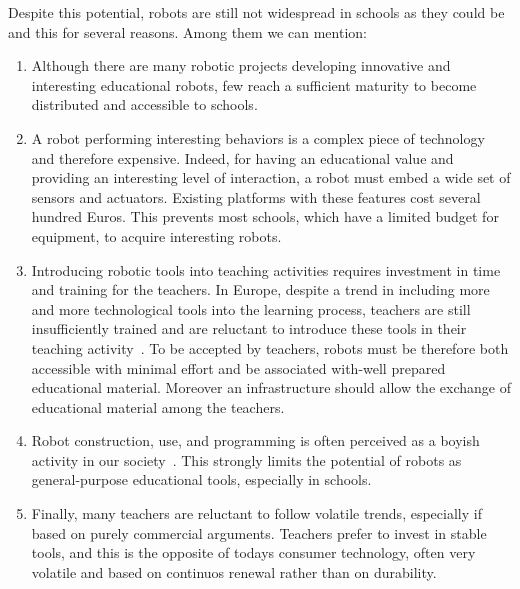 \documentclass[letterpaper, 10 pt, conference]{ieeeconf}  %
\begin{document}
Despite this potential, robots are still not widespread in schools as they could be and this for several reasons. Among them we can mention:
\begin{enumerate}
\item Although there are many robotic projects developing innovative and interesting educational robots, few reach a sufficient maturity to become distributed and accessible to schools. 
\item A robot performing interesting behaviors is a complex piece of technology and therefore expensive. 
Indeed, for having an educational value and providing an interesting level of interaction, a robot must embed a wide set of sensors and actuators.
Existing platforms with these features cost several hundred Euros.
This prevents most schools, which have a limited budget for equipment, to acquire interesting robots.
\item Introducing robotic tools into teaching activities requires investment in time and training for the teachers.
In Europe, despite a trend in including more and more technological tools into the learning process, teachers are still insufficiently trained and are reluctant to introduce these tools in their teaching activity~\cite{CERI2008}.
To be accepted by teachers, robots must be therefore both accessible with minimal effort and be associated with-well prepared educational material. 
Moreover an infrastructure should allow the exchange of educational material among the teachers.
\item Robot construction, use, and programming is often perceived as a boyish activity in our society~\cite{leonard2009lego,nourbakhsh2009robot}.
This strongly limits the potential of robots as general-purpose educational tools, especially in schools.
\item Finally, many teachers are reluctant to follow volatile trends, especially if based on purely commercial arguments. Teachers prefer to invest in stable tools, and this is the opposite of todays consumer technology, often very volatile and based on continuos renewal rather than on durability.
\end{enumerate}
\end{document}
